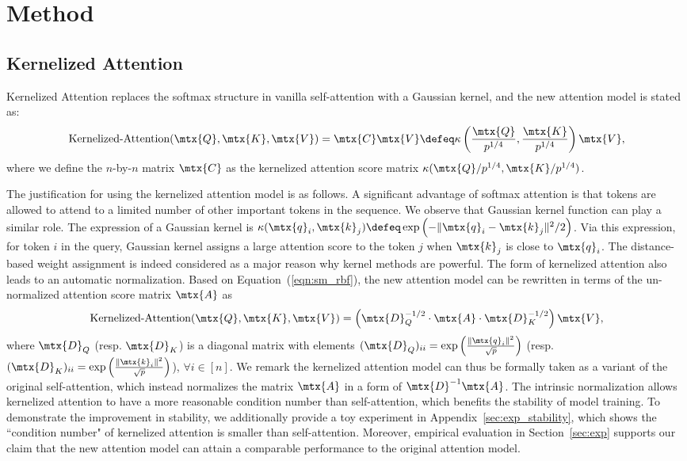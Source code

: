 \section{Method}
\label{Sec:Method}

\subsection{Kernelized Attention}
\label{sec:kernel_attn}

Kernelized Attention replaces the softmax structure in vanilla self-attention with a Gaussian kernel,
and the new attention model is stated as:
\begin{align}
\text{Kernelized-Attention}(\mtx{Q},\mtx{K},\mtx{V}) = \mtx{C} \mtx{V} \defeq \kappa\left(\frac{\mtx{Q}}{p^{1/4}}, \frac{\mtx{K}}{p^{1/4}} \right) \mtx{V},
\end{align}
where we define the $n$-by-$n$ matrix $\mtx{C}$ as the kernelized attention score matrix $\kappa(\mtx{Q} / p^{1/4}, \mtx{K} / p^{1/4})$.

The justification for using the kernelized attention model is as follows.
A significant advantage of softmax attention is that tokens are allowed to attend to a limited number of other important tokens in the sequence.
We observe that Gaussian kernel function can play a similar role.
The expression of a Gaussian kernel is $\kappa(\mtx{q}_i,  \mtx{k}_j) \defeq \exp \left(-\|\mtx{q}_i - \mtx{k}_j\|^2 / 2 \right)$.
Via this expression, for token $i$ in the query, Gaussian kernel assigns a large attention score to the token $j$ when $\mtx{k}_j$ is close to $\mtx{q}_i$.
The distance-based weight assignment is indeed considered as a major reason why kernel methods are powerful.
The form of kernelized attention also leads to an automatic normalization. 
Based on Equation~(\ref{eqn:sm_rbf}), the new attention model can be rewritten in terms of the un-normalized attention score matrix $\mtx{A}$ as
\begin{align*}
\text{Kernelized-Attention}(\mtx{Q},\mtx{K},\mtx{V}) = \left( \mtx{D}_Q^{-1/2} \cdot \mtx{A} \cdot \mtx{D}_K^{-1/2} \right) \mtx{V},
\end{align*}
where $\mtx{D}_Q$ (resp. $\mtx{D}_K$) is a diagonal matrix with elements $(\mtx{D}_Q)_{ii} = \exp\left( \frac{\|\mtx{q}_i\|^2}{\sqrt{p}} \right)$ 
(resp. $(\mtx{D}_K)_{ii} = \exp \left( \frac{\|\mtx{k}_i\|^2}{\sqrt{p}} \right)$), $\forall i \in [n]$.
We remark the kernelized attention model can thus be formally taken as a variant of the original self-attention, 
which instead normalizes the matrix $\mtx{A}$ in a form of $\mtx{D}^{-1} \mtx{A}$.
The intrinsic normalization allows kernelized attention to have a more reasonable condition number than self-attention, 
which benefits the stability of model training.
To demonstrate the improvement in stability, we additionally provide a toy experiment in Appendix~\ref{sec:exp_stability},
which shows the ``condition number" of kernelized attention is smaller than self-attention.
Moreover, empirical evaluation in Section~\ref{sec:exp} supports our claim that the new attention model can attain a comparable performance to the original attention model.


